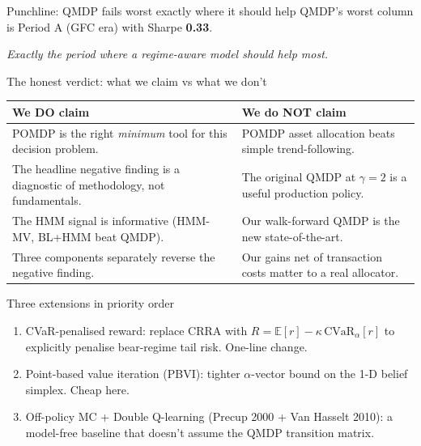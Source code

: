 \documentclass[11pt,aspectratio=169]{beamer}
\newcommand{\E}{\mathbb{E}}
\begin{document}
\begin{frame}{Punchline: QMDP fails worst exactly where it should help}
\bigskip
\centering
\Large QMDP's worst column is \alert{Period A (GFC era)} with Sharpe \textbf{0.33}.

\bigskip
\emph{Exactly the period where a regime-aware model should help most.}

\bigskip
{}
\end{frame}

\begin{frame}{The honest verdict: what we claim vs what we don't}
\bigskip
\centering\small\renewcommand{\arraystretch}{1.4}
\begin{tabular}{|>{\columncolor{cg!10}}p{}|>{\columncolor{cr!8}}p{}|}
\hline
\textbf{We DO claim} & \textbf{We do NOT claim} \\
\hline
POMDP is the right \emph{minimum} tool for this decision problem. & POMDP asset allocation beats simple trend-following. \\
\hline
The headline negative finding is a diagnostic of methodology, not fundamentals. & The original QMDP at $\gamma{=}2$ is a useful production policy. \\
\hline
The HMM signal is informative (HMM-MV, BL+HMM beat QMDP). & Our walk-forward QMDP is the new state-of-the-art. \\
\hline
Three components separately reverse the negative finding. & Our gains net of transaction costs matter to a real allocator. \\
\hline
\end{tabular}
\end{frame}

\begin{frame}{Three extensions in priority order}
\bigskip
\begin{enumerate}\setlength{\itemsep}{12pt}
  \item \alert{CVaR-penalised reward}: replace CRRA with $R = \E[r] - \kappa\,\mathrm{CVaR}_\alpha[r]$ to explicitly penalise bear-regime tail risk. One-line change.

  \item \alert{Point-based value iteration (PBVI)}: tighter $\alpha$-vector bound on the 1-D belief simplex. Cheap here.

  \item \alert{Off-policy MC + Double Q-learning} (Precup 2000 + Van Hasselt 2010): a model-free baseline that doesn't assume the QMDP transition matrix.
\end{enumerate}
\end{frame}
\end{document}
